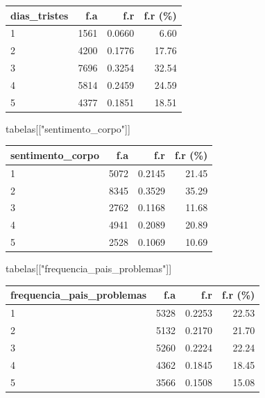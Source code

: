 \documentclass[
]{article}
\newenvironment{Shaded}{\begin{snugshade}}{\end{snugshade}}
\newcommand{\NormalTok}[1]{\textcolor[rgb]{0.00,0.23,0.31}{#1}}
\newcommand{\StringTok}[1]{\textcolor[rgb]{0.13,0.47,0.30}{#1}}
\begin{document}
\begin{longtable}[]{@{}lrrr@{}}
\toprule()
dias\_tristes & f.a & f.r & f.r (\%) \\
\midrule()
\endhead
1 & 1561 & 0.0660 & 6.60 \\
2 & 4200 & 0.1776 & 17.76 \\
3 & 7696 & 0.3254 & 32.54 \\
4 & 5814 & 0.2459 & 24.59 \\
5 & 4377 & 0.1851 & 18.51 \\
\bottomrule()
\end{longtable}

\begin{Shaded}
\begin{Highlighting}[]
\NormalTok{tabelas[[}\StringTok{"sentimento\_corpo"}\NormalTok{]]}
\end{Highlighting}
\end{Shaded}

\begin{longtable}[]{@{}lrrr@{}}
\toprule()
sentimento\_corpo & f.a & f.r & f.r (\%) \\
\midrule()
\endhead
1 & 5072 & 0.2145 & 21.45 \\
2 & 8345 & 0.3529 & 35.29 \\
3 & 2762 & 0.1168 & 11.68 \\
4 & 4941 & 0.2089 & 20.89 \\
5 & 2528 & 0.1069 & 10.69 \\
\bottomrule()
\end{longtable}

\begin{Shaded}
\begin{Highlighting}[]
\NormalTok{tabelas[[}\StringTok{"frequencia\_pais\_problemas"}\NormalTok{]]}
\end{Highlighting}
\end{Shaded}

\begin{longtable}[]{@{}lrrr@{}}
\toprule()
frequencia\_pais\_problemas & f.a & f.r & f.r (\%) \\
\midrule()
\endhead
1 & 5328 & 0.2253 & 22.53 \\
2 & 5132 & 0.2170 & 21.70 \\
3 & 5260 & 0.2224 & 22.24 \\
4 & 4362 & 0.1845 & 18.45 \\
5 & 3566 & 0.1508 & 15.08 \\
\bottomrule()
\end{longtable}
\end{document}
